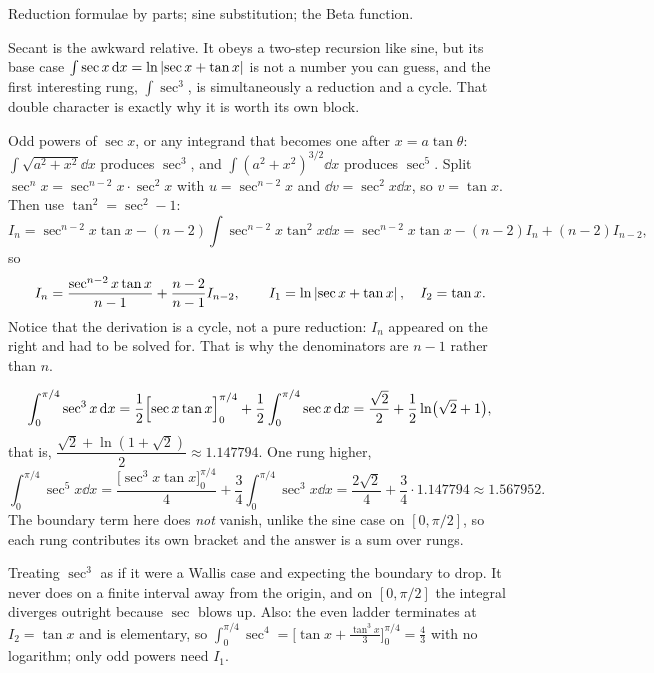 \begin{seealsob}Reduction formulae by parts; sine substitution; the Beta function.\end{seealsob}

Secant is the awkward relative. It obeys a two-step recursion like sine, but its base case $\int\sec x\,\mathrm{d} x=\ln\left\lvert \sec x+\tan x\right\rvert$ is not a number you can guess, and the first interesting rung, $\int\sec^{3}$, is simultaneously a reduction and a cycle. That double character is exactly why it is worth its own block.

\cue Odd powers of $\sec x$, or any integrand that becomes one after $x=a\tan\theta$: $\int\sqrt{a^{2}+x^{2}}\dd x$ produces $\sec^{3}$, and $\int(a^{2}+x^{2})^{3/2}\dd x$ produces $\sec^{5}$.
\method Split $\sec^{n}x=\sec^{n-2}x\cdot\sec^{2}x$ with $u=\sec^{n-2}x$ and $\dd v=\sec^{2}x\dd x$, so $v=\tan x$. Then use $\tan^{2}=\sec^{2}-1$:
\[I_n=\sec^{n-2}x\tan x-(n-2)\int\sec^{n-2}x\tan^{2}x\dd x=\sec^{n-2}x\tan x-(n-2)I_n+(n-2)I_{n-2},\]
so
\[I_n=\frac{\sec^{n-2}x\tan x}{n-1}+\frac{n-2}{n-1}I_{n-2},\qquad I_1=\ln\left\lvert \sec x+\tan x\right\rvert,\quad I_2=\tan x.\]
Notice that the derivation is a cycle, not a pure reduction: $I_n$ appeared on the right and had to be solved for. That is why the denominators are $n-1$ rather than $n$.

\begin{worked}
\[\int_0^{\pi/4}\sec^{3}x\,\mathrm{d} x=\frac12\Bigl[\sec x\tan x\Bigr]_0^{\pi/4}+\frac12\int_0^{\pi/4}\sec x\,\mathrm{d} x=\frac{\sqrt2}{2}+\frac12\ln\bigl(\sqrt2+1\bigr),\]
that is, $\dfrac{\sqrt2+\ln(1+\sqrt2)}{2}\approx1.147794$. One rung higher,
\[\int_0^{\pi/4}\sec^{5}x\dd x=\frac{\bigl[\sec^{3}x\tan x\bigr]_0^{\pi/4}}{4}+\frac34\int_0^{\pi/4}\sec^{3}x\dd x=\frac{2\sqrt2}{4}+\frac34\cdot1.147794\approx1.567952.\]
The boundary term here does \emph{not} vanish, unlike the sine case on $[0,\pi/2]$, so each rung contributes its own bracket and the answer is a sum over rungs.
\end{worked}

\begin{trap}
Treating $\sec^{3}$ as if it were a Wallis case and expecting the boundary to drop. It never does on a finite interval away from the origin, and on $[0,\pi/2]$ the integral diverges outright because $\sec$ blows up. Also: the even ladder terminates at $I_2=\tan x$ and is elementary, so $\int_0^{\pi/4}\sec^{4}=\bigl[\tan x+\tfrac{\tan^{3}x}{3}\bigr]_0^{\pi/4}=\tfrac43$ with no logarithm; only odd powers need $I_1$.
\end{trap}

